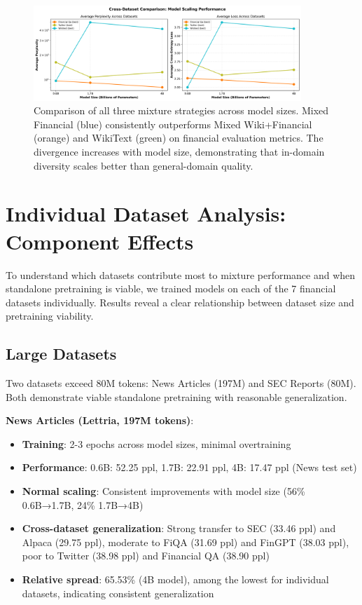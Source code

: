 \begin{figure}[h]
\centering
\includegraphics[width=0.9\textwidth]{figures/scaling_comparison_all.png}
\caption[Comparison of Mixture Strategies]{Comparison of all three mixture strategies across model sizes. Mixed Financial (blue) consistently outperforms Mixed Wiki+Financial (orange) and WikiText (green) on financial evaluation metrics. The divergence increases with model size, demonstrating that in-domain diversity scales better than general-domain quality.}
\label{fig:scaling_comparison_all}
\end{figure}

\section{Individual Dataset Analysis: Component Effects}

To understand which datasets contribute most to mixture performance and when standalone pretraining is viable, we trained models on each of the 7 financial datasets individually. Results reveal a clear relationship between dataset size and pretraining viability.

\subsection{Large Datasets}

Two datasets exceed 80M tokens: News Articles (197M) and SEC Reports (80M). Both demonstrate viable standalone pretraining with reasonable generalization.

\textbf{News Articles (Lettria, 197M tokens)}:
\begin{itemize}
\item \textbf{Training}: 2-3 epochs across model sizes, minimal overtraining
\item \textbf{Performance}: 0.6B: 52.25 ppl, 1.7B: 22.91 ppl, 4B: 17.47 ppl (News test set)
\item \textbf{Normal scaling}: Consistent improvements with model size (56\% 0.6B→1.7B, 24\% 1.7B→4B)
\item \textbf{Cross-dataset generalization}: Strong transfer to SEC (33.46 ppl) and Alpaca (29.75 ppl), moderate to FiQA (31.69 ppl) and FinGPT (38.03 ppl), poor to Twitter (38.98 ppl) and Financial QA (38.90 ppl)
\item \textbf{Relative spread}: 65.53\% (4B model), among the lowest for individual datasets, indicating consistent generalization
\end{itemize}

